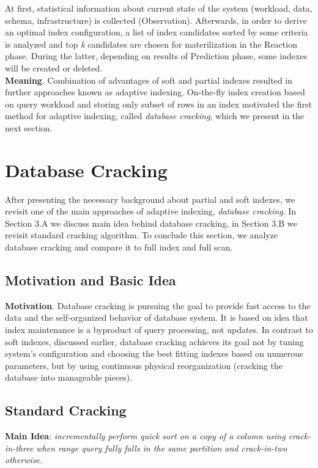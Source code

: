 \documentclass[10pt, conference, compsocconf]{IEEEtran}
\begin{document}
At first, statistical information about current state of the system (workload, data, schema, infrastructure) is collected (Observation). Afterwards, in order to derive an optimal index configuration, a list of index candidates sorted by some criteria is analyzed and top \textit{k} candidates are chosen for materilization in the Reaction phase. During the latter, depending on results of Prediction phase, some indexes will be created or deleted.\\

\textbf{Meaning}. Combination of advantages of soft and partial indexes resulted in further approaches known as adaptive indexing. On-the-fly index creation based on query workload and storing only subset of rows in an index motivated the first method for adaptive indexing, called \textit{database cracking}, which we present in the next section.

\section{Database Cracking}
After presenting the necessary background about partial and soft indexes, we revisit one of the main approaches of adaptive indexing, \textit{database cracking}. In Section 3.A we discuss main idea behind database cracking, in Section 3.B we revisit standard cracking algorithm. To conclude this section, we analyze database cracking and compare it to full index and full scan.

\subsection{Motivation and Basic Idea}
\textbf{Motivation}. Database cracking is pursuing the goal to provide fast access to the data and the self-organized behavior of database system. It is based on idea that index maintenance is a byproduct of query processing, not updates. In contrast to soft indexes, discussed earlier, database cracking achieves its goal not by tuning system's configuration and choosing the best fitting indexes based on numerous parameters, but by using continuous physical reorganization (cracking the database into manageable pieces).

\subsection{Standard Cracking}
\textbf{Main Idea}: \textit{incrementally perform quick sort on a copy of a column using crack-in-three when range query fully falls in the same partition and crack-in-two otherwise.}\\
\end{document}
